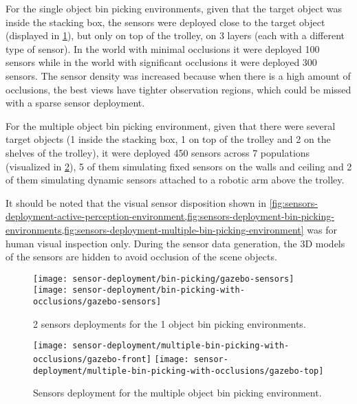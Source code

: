 For the single object bin picking environments, given that the target object was inside the stacking box, the sensors were deployed close to the target object (displayed in \cref{fig:sensors-deployment-bin-picking-environments}), but only on top of the trolley, on 3 layers (each with a different type of sensor). In the world with minimal occlusions it were deployed 100 sensors while in the world with significant occlusions it were deployed 300 sensors. The sensor density was increased because when there is a high amount of occlusions, the best views have tighter observation regions, which could be missed with a sparse sensor deployment.

For the multiple object bin picking environment, given that there were several target objects (1 inside the stacking box, 1 on top of the trolley and 2 on the shelves of the trolley), it were deployed 450 sensors across 7 populations (visualized in \cref{fig:sensors-deployment-multiple-bin-picking-environment}), 5 of them simulating fixed sensors on the walls and ceiling and 2 of them simulating dynamic sensors attached to a robotic arm above the trolley.

It should be noted that the visual sensor disposition shown in \cref{fig:sensors-deployment-active-perception-environment,fig:sensors-deployment-bin-picking-environments,fig:sensors-deployment-multiple-bin-picking-environment} was for human visual inspection only. During the sensor data generation, the 3D models of the sensors are hidden to avoid occlusion of the scene objects.

\begin{figure}[H]
	\centering
	\texttt{[image: sensor-deployment/bin-picking/gazebo-sensors]}\hspace{1em}
	\texttt{[image: sensor-deployment/bin-picking-with-occlusions/gazebo-sensors]}
	\caption{2 sensors deployments for the 1 object bin picking environments.}
	\label{fig:sensors-deployment-bin-picking-environments}
\end{figure}

\begin{figure}[H]
	\centering
	\texttt{[image: sensor-deployment/multiple-bin-picking-with-occlusions/gazebo-front]}\hspace{0.25em}
	\texttt{[image: sensor-deployment/multiple-bin-picking-with-occlusions/gazebo-top]}
	\caption{Sensors deployment for the multiple object bin picking environment.}
	\label{fig:sensors-deployment-multiple-bin-picking-environment}
\end{figure}

